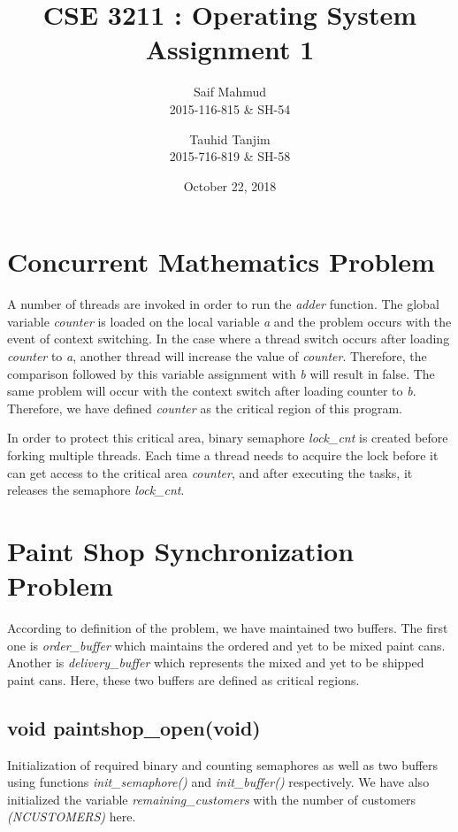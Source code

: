 \documentclass[a4paper]{article}
\title{CSE 3211 : Operating System Assignment 1} %
\author{Saif Mahmud\\
	2015-116-815 \& SH-54
	\and
	Tauhid Tanjim\\
	2015-716-819 \& SH-58
}
\date{October 22, 2018}
\begin{document}
\maketitle

\section{Concurrent Mathematics Problem}
\label{sec:math}

A number of threads are invoked in order to run the \textit{adder} function. The global variable \textit{counter} is loaded on the local variable \textit{a} and the problem occurs with the event of context switching. In the case where a thread switch occurs after loading \textit{counter} to \textit{a}, another thread will increase the value of \textit{counter}. Therefore, the comparison followed by this variable assignment with \textit{b} will result in false. The same problem will occur with the context switch after loading counter to \textit{b}. Therefore, we have defined \textit{counter} as the critical region of this program.

In order to protect this critical area, binary semaphore \textit{lock\_cnt} is created before forking multiple threads. Each time a thread needs to acquire the lock before it can get access to the critical area \textit{counter}, and after executing the tasks, it releases the semaphore \textit{lock\_cnt}.

\section{Paint Shop Synchronization Problem}
\label{sec:paintshop}

According to definition of the problem, we have maintained two buffers. The first one is \textit{order\_buffer} which maintains the ordered and yet to be mixed paint cans. Another is \textit{delivery\_buffer} which represents the mixed and yet to be shipped paint cans. Here, these two buffers are defined as critical regions.

\subsection{void paintshop\_open(void)}
Initialization of required binary and counting semaphores as well as two buffers using functions \textit{init\_semaphore()} and \textit{init\_buffer()} respectively. We have also initialized the variable \textit{remaining\_customers} with the number of customers \textit{(NCUSTOMERS)} here.
\end{document}
